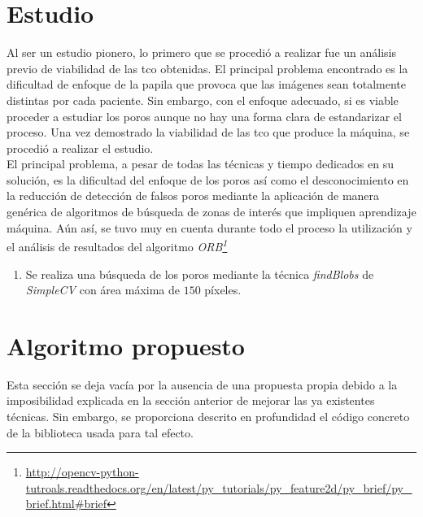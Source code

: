 \section{Estudio}
Al ser un estudio pionero, lo primero que se procedió a realizar fue
un análisis previo de viabilidad de las \gls{tco} obtenidas. El
principal problema encontrado es la dificultad de enfoque de la papila
que provoca que las imágenes sean totalmente distintas por cada
paciente. Sin embargo, con el enfoque adecuado, si es viable proceder
a estudiar los poros aunque no hay una forma clara de estandarizar el
proceso. Una vez demostrado la viabilidad de las \gls{tco} que produce
la máquina, se procedió a realizar el estudio.\\
El principal problema, a pesar de todas las técnicas y tiempo
dedicados en su solución, es la dificultad del enfoque de los poros así
como el desconocimiento en la reducción de detección de falsos poros
mediante la aplicación de manera genérica de algoritmos de búsqueda de
zonas de interés que impliquen aprendizaje
máquina. Aún así, se tuvo muy en cuenta durante todo el proceso la
utilización y el análisis de resultados del algoritmo
\emph{ORB\footnote{\url{http://opencv-python-tutroals.readthedocs.org/en/latest/py\_tutorials/py\_feature2d/py\_brief/py\_brief.html\#brief}}\cite{orb-bib}}
\begin{enumerate}
\item Se realiza una búsqueda de los poros mediante la técnica
  \emph{findBlobs} de \emph{SimpleCV} con área máxima de $150$
  píxeles.
\end{enumerate}

\section{Algoritmo propuesto}
Esta sección se deja vacía por la ausencia de una propuesta propia
debido a la imposibilidad explicada en la sección anterior de mejorar
las ya existentes técnicas. Sin embargo, se proporciona descrito en
profundidad el código concreto de la biblioteca usada para tal efecto.
